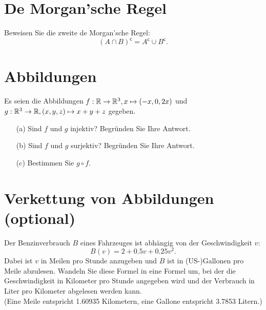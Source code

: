 \documentclass[
				a4paper,
				10pt
			]
			{scrartcl}
\begin{document}

\section{De Morgan'sche Regel}
Beweisen Sie die zweite de Morgan'sche Regel:
$$
	(A \cap B)^{\mathsf{c}} = A^{\mathsf{c}} \cup B^{\mathsf{c}}.
$$

\section{Abbildungen}
Es seien die Abbildungen $f:\mathbb{R} \to \mathbb{R}^3, x \mapsto (-x, 0, 2x)$ und $g: \mathbb{R}^3 \to \mathbb{R}, (x,y,z) \mapsto x+y+z$ gegeben. 
\begin{itemize}
\item[(a)] Sind $f$ und $g$ injektiv? Begr\"unden Sie Ihre Antwort.
\item[(b)] Sind $f$ und $g$ surjektiv? Begr\"unden Sie Ihre Antwort.
\item[(c)] Bestimmen Sie $g \circ f$.
\end{itemize}


\section{Verkettung von Abbildungen (optional)}

Der Benzinverbrauch $B$ eines Fahrzeuges ist abh\"angig von der Geschwindigkeit $v$:
$$ 
	B(v) = 2 + 0.5v + 0.25v^2.
$$
Dabei ist $v$ in Meilen pro Stunde anzugeben und $B$ ist in (US-)Gallonen pro Meile abzulesen. 
Wandeln Sie diese Formel in eine Formel um, bei der die Geschwindigkeit in Kilometer pro Stunde angegeben wird und 
der Verbrauch in Liter pro Kilometer abgelesen werden kann.\\
(Eine Meile entspricht 1.60935 Kilometern, eine Gallone entspricht 3.7853 Litern.)
\end{document}
